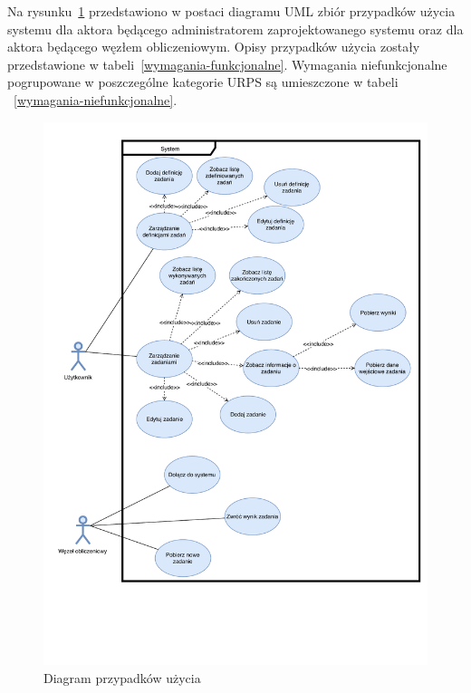 \documentclass[a4paper,11pt,twoside]{report}
\theoremstyle{definition}
\begin{document}
            Na rysunku~\ref{use-cases-diagram} przedstawiono w postaci diagramu UML zbiór przypadków użycia systemu dla aktora będącego administratorem zaprojektowanego systemu oraz dla aktora będącego węzłem obliczeniowym. Opisy przypadków użycia zostały przedstawione w tabeli~\ref{wymagania-funkcjonalne}. Wymagania niefunkcjonalne pogrupowane w poszczególne kategorie URPS są umieszczone w tabeli ~\ref{wymagania-niefunkcjonalne}.
            
            \begin{figure}
                \centering
                \includegraphics[width=\textwidth,height=\textheight,keepaspectratio]{images/use-cases.pdf}
                \caption{Diagram przypadków użycia}
                \label{use-cases-diagram}
            \end{figure}
        
\end{document}
